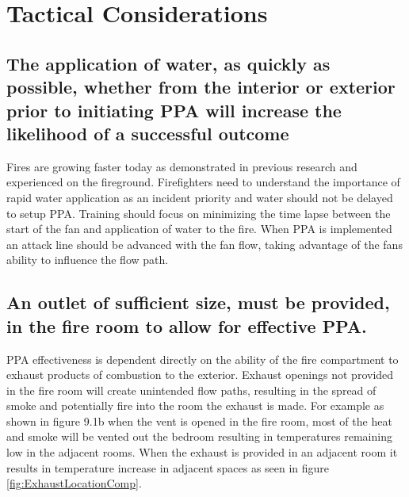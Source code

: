 \documentclass{article}
\begin{document}
\section{Tactical Considerations}

\subsection{The application of water, as quickly as possible, whether from the interior or exterior prior to initiating PPA will increase the likelihood of a successful outcome}
Fires are growing faster today as demonstrated in previous research and experienced on the fireground.  Firefighters need to understand the importance of rapid water application as an incident priority and water should not be delayed to setup PPA.  Training should focus on minimizing the time lapse between the start of the fan and application of water to the fire.  When PPA is implemented an attack line should be advanced with the fan flow, taking advantage of the fans ability to influence the flow path.

\subsection{An outlet of sufficient size, must be provided, in the fire room to allow for effective PPA.} \label{sec:OutletInFireRoom}
PPA effectiveness is dependent directly on the ability of the fire compartment to exhaust products of combustion to the exterior. Exhaust openings not provided in the fire room will create unintended flow paths, resulting in the spread of smoke and potentially fire into the room the exhaust is made. For example as shown in figure 9.1b when the vent is opened in the fire room, most of the heat and smoke will be vented out the bedroom resulting in temperatures remaining low in the adjacent rooms. When the exhaust is provided in an adjacent room it results in temperature increase in adjacent spaces as seen in figure \ref{fig:ExhaustLocationComp}.
\end{document}
